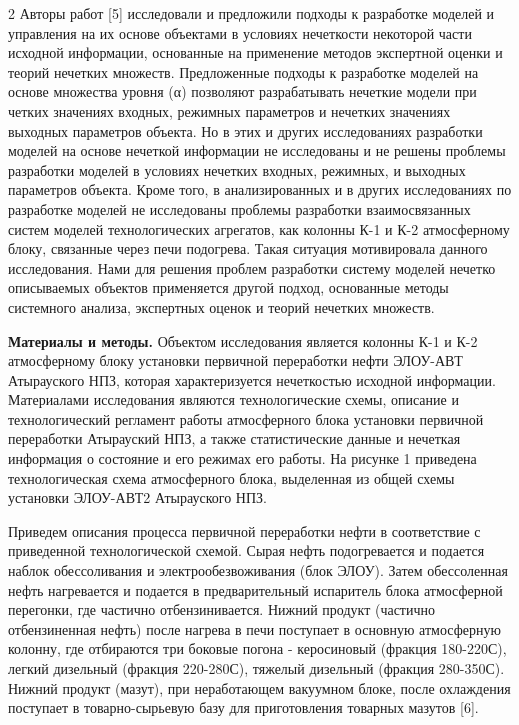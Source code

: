 \begin{multicols}{2}
Авторы работ {[}5{]} исследовали и предложили подходы к разработке
моделей и управления на их основе объектами в условиях нечеткости
некоторой части исходной информации, основанные на применение методов
экспертной оценки и теорий нечетких множеств. Предложенные подходы к
разработке моделей на основе множества уровня (α) позволяют
разрабатывать нечеткие модели при четких значениях входных, режимных
параметров и нечетких значениях выходных параметров объекта. Но в этих и
других исследованиях разработки моделей на основе нечеткой информации не
исследованы и не решены проблемы разработки моделей в условиях нечетких
входных, режимных, и выходных параметров объекта. Кроме того, в
анализированных и в других исследованиях по разработке моделей не
исследованы проблемы разработки взаимосвязанных систем моделей
технологических агрегатов, как колонны К-1 и К-2 атмосферному блоку,
связанные через печи подогрева. Такая ситуация мотивировала данного
исследования. Нами для решения проблем разработки систему моделей
нечетко описываемых объектов применяется другой подход, основанные
методы системного анализа, экспертных оценок и теорий нечетких множеств.

{\bfseries Материалы и методы.} Объектом исследования является колонны К-1
и К-2 атмосферному блоку установки первичной переработки нефти ЭЛОУ-АВТ
Атырауского НПЗ, которая характеризуется нечеткостью исходной
информации. Материалами исследования являются технологические схемы,
описание и технологический регламент работы атмосферного блока установки
первичной переработки Атырауский НПЗ, а также статистические данные и
нечеткая информация о состояние и его режимах его работы. На рисунке 1
приведена технологическая схема атмосферного блока, выделенная из общей
схемы установки ЭЛОУ-АВТ2 Атырауского НПЗ.

Приведем описания процесса первичной переработки нефти в соответствие с
приведенной технологической схемой. Сырая нефть подогревается и подается
наблок обессоливания и электрообезвоживания (блок ЭЛОУ). Затем
обессоленная нефть нагревается и подается в предварительный испаритель
блока атмосферной перегонки, где частично отбензинивается.
Нижний продукт (частично отбензиненная нефть) после нагрева в печи
поступает в основную атмосферную колонну, где отбираются три боковые
погона - керосиновый (фракция 180-220С), легкий
дизельный (фракция 220-280С), тяжелый дизельный
(фракция 280-350С). Нижний продукт (мазут), при
неработающем вакуумном блоке, после охлаждения поступает в
товарно-сырьевую базу для приготовления товарных мазутов {[}6{]}.


\end{multicols}

